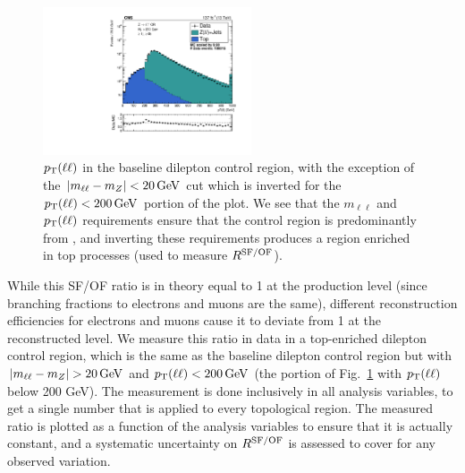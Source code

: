 \begin{figure}[ht]
  \begin{center}
    \includegraphics[width=0.55\textwidth]{figs/zinv/crdybase_zllpt.pdf}
    \caption{$p_{\mathrm{T}}(\ell\ell)$ in the baseline dilepton control region, with the exception
      of the $|m_{\ell\ell}-m_Z|<20\,\text{Ge\hspace{-.08em}V}$ cut which is inverted for the $p_{\mathrm{T}}(\ell\ell)<200\,\text{Ge\hspace{-.08em}V}$
      portion of the plot. We see that the $m_{\ell\ell}$ and $p_{\mathrm{T}}(\ell\ell)$ requirements ensure
      that the control region is predominantly from \zll, and inverting these requirements produces
      a region enriched in top processes (used to measure $R^{\mathrm{SF/OF}}$).
            }
    \label{fig:zllpt}
  \end{center}
\end{figure}

While this SF/OF ratio is in theory equal to 1 at the production level (since branching fractions to electrons
and muons are the same), different reconstruction efficiencies for electrons and muons cause it to deviate 
from 1 at the reconstructed level. We measure this ratio in data in a top-enriched dilepton control region,
which is the same as the baseline dilepton control region but with $|m_{\ell\ell}-m_Z|>20\GeV$ and
$p_{\mathrm{T}}(\ell\ell)<200\,\text{Ge\hspace{-.08em}V}$ (the portion of Fig.~\ref{fig:zllpt} with $p_{\mathrm{T}}(\ell\ell)$ below 200 GeV).
The measurement is done inclusively in all analysis variables, to get a single number that is applied 
to every topological region. The measured ratio is plotted as a function of the analysis variables to
ensure that it is actually constant, and a systematic uncertainty on $R^{\mathrm{SF/OF}}$ is assessed to
cover for any observed variation.

